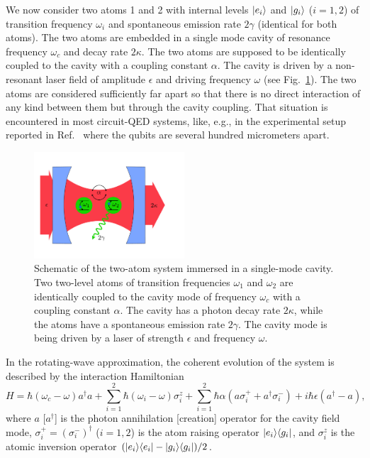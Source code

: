 We now consider two atoms 1 and 2 with internal levels $| e_i \rangle$ and $| g_i \rangle$ ($i=1,2$) of transition frequency $\omega_i$ and spontaneous emission rate $2\gamma$ (identical for both atoms). The two atoms are embedded in a single mode cavity of resonance frequency $\omega_c$ and decay rate $2\kappa$. The two atoms are supposed to be identically coupled to the cavity with a coupling constant $\alpha$. The cavity is driven by a non-resonant laser field of amplitude $\epsilon$ and driving frequency $\omega$ (see Fig.~\ref{fig-setup}). The two atoms are considered sufficiently far apart so that there is no direct interaction of any kind between them but through the cavity coupling. That situation is encountered in most circuit-QED systems, like, e.g., in the experimental setup reported in Ref.~\cite{Fin09} where the qubits are several hundred micrometers apart.

\begin{figure}
\center
\includegraphics[width=0.5\textwidth]{Images/chap5/setup.pdf}
\caption[Schematic of the two-atom system]{Schematic of the two-atom system immersed in a single-mode cavity. Two two-level atoms of transition frequencies $\omega_1$ and $\omega_2$ are identically coupled to the cavity mode of frequency $\omega_c$ with a coupling constant $\alpha$. The cavity has a photon decay rate $2\kappa$, while the atoms have a spontaneous emission rate $2\gamma$. The cavity mode is being driven by a laser of strength $\epsilon$ and frequency $\omega$.}
\label{fig-setup}
\end{figure}

In the rotating-wave approximation, the coherent evolution of the system is described by the interaction Hamiltonian
\[ H = \hbar (\omega_c - \omega) a^\dagger a + \sum_{i=1}^2 \hbar (\omega_i-\omega) \sigma^{z}_i + \sum_{i=1}^2 \hbar \alpha (a \sigma^+_i+a^\dagger \sigma^-_i) + i \hbar \epsilon(a^\dagger - a) , \label{eq-H}\]
where $a$ [$a^\dagger$] is the photon annihilation [creation] operator for the cavity field mode, $\sigma_i^+ = (\sigma_i^-)^{\dagger}$ ($i = 1,2$) is the atom raising operator $| e_i \rangle \langle g_i |$, and $\sigma_i^z$ is the atomic inversion operator $(| e_i \rangle \langle e_i |-| g_i \rangle \langle g_i |)/2$.

